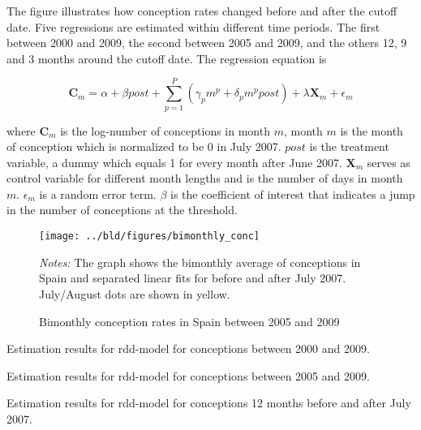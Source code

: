 \documentclass[11pt, a4paper, leqno]{article}
\begin{document}
The figure illustrates how conception rates changed before and after the cutoff date.
Five regressions are estimated within different time periods. The first between 2000 and 2009, the second between 2005 and 2009,
and the others 12, 9 and 3 months around the cutoff date.
The regression equation is

\begin{equation} \label{eq:main}
    \boldsymbol{C}_m= \alpha + \beta post + \sum_{p=1}^{P} (\gamma_p m^p + \delta_p m^p post)  + \lambda \boldsymbol{X}_m + \epsilon_m
\end{equation}

where $\boldsymbol{C}_m$ is the log-number of conceptions in month $m$, month $m$ is the month of conception which is
normalized to be 0 in July 2007. $post$ is the treatment variable, a dummy which equals 1 for every month after June 2007.
$\boldsymbol{X}_m$ serves as control variable for different month lengths and is the number of days in month $m$. $\epsilon_m$
is a random error term. $\beta$ is the coefficient of interest that indicates a jump in the number of conceptions at the threshold.


\begin{figure}[H]

    \centering
    \texttt{[image: ../bld/figures/bimonthly\_conc]}

    \caption{Bimonthly conception rates in Spain between 2005 and 2009}
    \label{fig:conc}
    \begin{footnotesize} \textit{Notes:} The graph shows the bimonthly average of conceptions in Spain and separated linear fits for before
        and after July 2007. July/August dots are shown in yellow.
    \end{footnotesize}

\end{figure}


\begin{table}[!h]
    
    \caption{\label{tab:reg0} Estimation results for rdd-model for conceptions between 2000 and 2009.}
\end{table}

\begin{table}[!h]
    
    \caption{\label{tab:reg1} Estimation results for rdd-model for conceptions between 2005 and 2009.}
\end{table}

\begin{table}[!h]
    
    \caption{\label{tab:reg2} Estimation results for rdd-model for conceptions 12 months before and after July 2007.}
\end{table}
\end{document}
